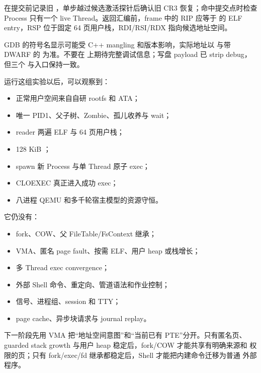 在提交前记录旧 ，单步越过候选激活探针后确认旧 CR3
恢复；命中提交点时检查 Process 只有一个 live Thread。返回汇编前，frame
中的 RIP 应等于  的 ELF entry，RSP 位于固定
64 页用户栈，RDI/RSI/RDX 指向候选地址空间。

GDB 的符号名显示可能受 C++ mangling 和版本影响，实际地址以
 与带 DWARF 的  为准。不要在
 上期待完整调试信息；写盘 payload 已 strip
debug，但三个  与入口保持一致。

运行这组实验以后，可以观察到：

\begin{itemize}
  \item 正常用户空间来自自研 rootfs 和 ATA；
  \item 唯一 PID1、父子树、Zombie、孤儿收养与 wait；
  \item reader 两遍 ELF 与 64 页用户栈；
  \item 128 KiB ；
  \item spawn 新 Process 与单 Thread 原子 exec；
  \item CLOEXEC 真正进入成功 exec；
  \item 八进程 QEMU 和多千轮宿主模型的资源守恒。
\end{itemize}

它仍没有：

\begin{itemize}
  \item fork、COW、父 FileTable/FsContext 继承；
  \item VMA、匿名 page fault、按需 ELF、用户 heap 或栈增长；
  \item 多 Thread exec convergence；
  \item 外部 Shell 命令、重定向、管道语法和作业控制；
  \item 信号、进程组、session 和 TTY；
  \item page cache、异步块请求与 journal replay。
\end{itemize}

下一阶段先用 VMA 把“地址空间意图”和“当前已有 PTE”分开。只有匿名页、
guarded stack growth 与用户 heap 稳定后，fork/COW 才能共享有明确来源和
权限的页；只有 fork/exec/fd 继承都稳定后，Shell 才能把内建命令迁移为普通
外部程序。
